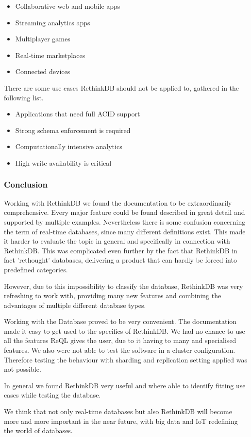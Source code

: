 \begin{itemize}
    \item Collaborative web and mobile apps
    \item Streaming analytics apps
    \item Multiplayer games
    \item Real-time marketplaces
    \item Connected devices
\end{itemize}
There are some use cases RethinkDB should not be applied to, gathered in the following list.

\begin{itemize}
    \item Applications that need full ACID support
    \item Strong schema enforcement is required
    \item Computationally intensive analytics
    \item High write availability is critical
\end{itemize}

\subsubsection{Conclusion}

Working with RethinkDB we found the documentation to be extraordinarily comprehensive. Every major feature could be found described in great detail and supported by multiple examples. Nevertheless there is some confusion concerning the term of real-time databases, since many different definitions exist. This made it harder to evaluate the topic in general and specifically in connection with RethinkDB. This was complicated even further by the fact that RethinkDB in fact 'rethought' databases, delivering a product that can hardly be forced into predefined categories.

However, due to this impossibility to classify the database, RethinkDB was very refreshing to work with, providing many new features and combining the advantages of multiple different database types.

Working with the Database proved to be very convenient. The documentation made it easy to get used to the specifics of RethinkDB. We had no chance to use all the features ReQL gives the user, due to it having to many and specialised features. We also were not able to test the software in a cluster configuration. Therefore testing the behaviour with sharding and replication setting applied was not possible.

In general we found RethinkDB very useful and where able to identify fitting use cases while testing the database.

We think that not only real-time databases but also RethinkDB will become more and more important in the near future, with big data and IoT redefining the world of databases. 
